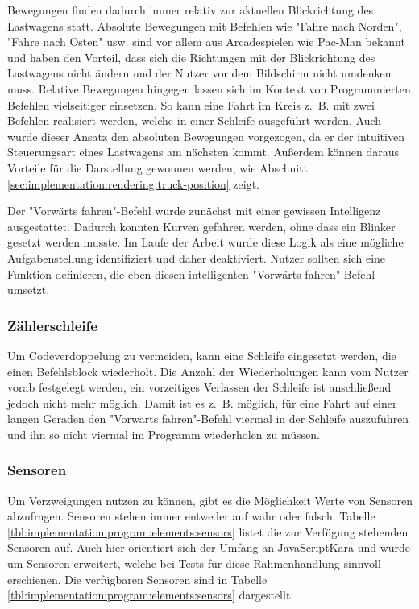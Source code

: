 Bewegungen finden dadurch immer relativ zur aktuellen Blickrichtung des Lastwagens statt. Absolute Bewegungen mit Befehlen wie "Fahre nach Norden", "Fahre nach Osten" usw. sind vor allem aus Arcadespielen wie Pac-Man bekannt und haben den Vorteil, dass sich die Richtungen mit der Blickrichtung des Lastwagens nicht ändern und der Nutzer vor dem Bildschirm nicht umdenken muss. Relative Bewegungen hingegen lassen sich im Kontext von Programmierten Befehlen vielseitiger einsetzen. So kann eine Fahrt im Kreis z.~B. mit zwei Befehlen realisiert werden, welche in einer Schleife ausgeführt werden. Auch wurde dieser Ansatz den absoluten Bewegungen vorgezogen, da er der intuitiven Steuerungsart eines Lastwagens am nächsten kommt. Außerdem können daraus Vorteile für die Darstellung gewonnen werden, wie Abschnitt \ref{sec:implementation:rendering:truck-position} zeigt.

Der "Vorwärts fahren"-Befehl wurde zunächst mit einer gewissen Intelligenz ausgestattet. Dadurch konnten Kurven gefahren werden, ohne dass ein Blinker gesetzt werden musste. Im Laufe der Arbeit wurde diese Logik als eine mögliche Aufgabenstellung identifiziert und daher deaktiviert. Nutzer sollten sich eine Funktion definieren, die eben diesen intelligenten "Vorwärts fahren"-Befehl umsetzt.

\subsubsection{Zählerschleife}
\label{sec:implementation:program:elements:for}

Um Codeverdoppelung zu vermeiden, kann eine Schleife eingesetzt werden, die einen Befehlsblock wiederholt. Die Anzahl der Wiederholungen kann vom Nutzer vorab festgelegt werden, ein vorzeitiges Verlassen der Schleife ist anschließend jedoch nicht mehr möglich. Damit ist es z.~B. möglich, für eine Fahrt auf einer langen Geraden den "Vorwärts fahren"-Befehl viermal in der Schleife auszuführen und ihn so nicht viermal im Programm wiederholen zu müssen.

\subsubsection{Sensoren}
\label{sec:implementation:program:elements:sensors}

Um Verzweigungen nutzen zu können, gibt es die Möglichkeit Werte von Sensoren abzufragen. Sensoren stehen immer entweder auf wahr oder falsch. Tabelle \ref{tbl:implementation:program:elements:sensors} listet die zur Verfügung stehenden Sensoren auf. Auch hier orientiert sich der Umfang an JavaScriptKara und wurde um Sensoren erweitert, welche bei Tests für diese Rahmenhandlung sinnvoll erschienen. Die verfügbaren Sensoren sind in Tabelle \ref{tbl:implementation:program:elements:sensors} dargestellt.

